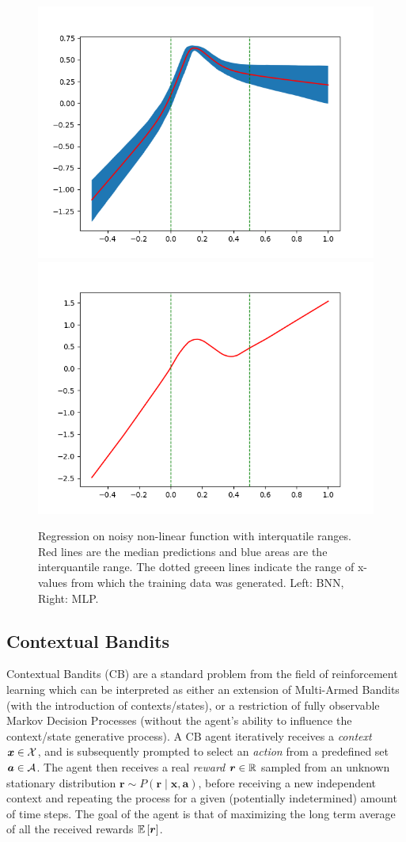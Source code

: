 \documentclass[11pt]{article}
\begin{document}
\begin{figure}
  \centering\includegraphics[width=.45\textwidth]{figures/reg_bnn_extended.png}
  \centering\includegraphics[width=.45\textwidth]{figures/reg_mlp_extended.png}
  \caption{Regression on noisy non-linear function with interquatile ranges.
  Red lines are the median predictions and blue areas are the interquantile range.
	The dotted greeen lines indicate the range of x-values from which the training
  data was generated.
  Left: BNN, Right: MLP.}
  \label{fig:reg_extended}
\end{figure}

\subsection{Contextual Bandits}

Contextual Bandits (CB) are a standard problem from the field of reinforcement
learning which can be interpreted as either an extension of Multi-Armed Bandits
(with the introduction of contexts/states), or a restriction of fully
observable Markov Decision Processes (without the agent's ability to influence
the context/state generative process).  A CB agent iteratively receives
a \emph{context} $\bm x\in{\mathcal{X}}$, and is subsequently prompted to select an
\emph{action} from a predefined set $\bm a\in{\mathcal{A}}$.  The agent then receives
a real \emph{reward} $\bm r\in{\mathbb{R}}$ sampled from an unknown stationary
distribution $\bm r\sim P(\bm r\mid \bm x, \bm a)$, before receiving a new
independent context and repeating the process for a given (potentially
indetermined) amount of time steps.  The goal of the agent is that of
maximizing the long term average of all the received rewards ${\mathbb{E}}\left[\bm
r\right]$.  
\end{document}
